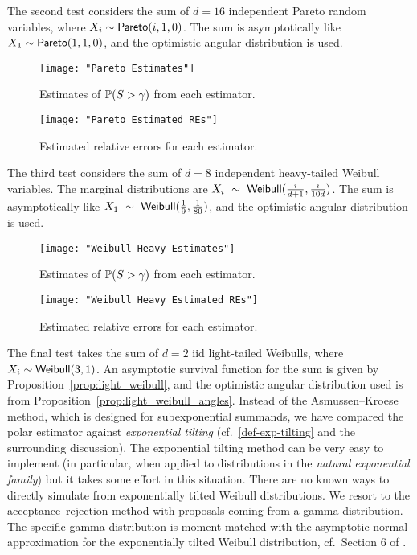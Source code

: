 The second test considers the sum of $d=16$ independent Pareto random variables, where $X_i \sim \mathsf{Pareto}(i, 1, 0)$. The sum is asymptotically like $X_1 \sim \mathsf{Pareto}(1, 1, 0)$, and the optimistic angular distribution is used.
\begin{figure}[H]
	\centering
	\texttt{[image: "Pareto Estimates"]}
	\caption{Estimates of $\operatorname{{\mathbb P}}(S > \gamma)$ from each estimator.}
\end{figure}

\begin{figure}[H]
	\centering
	\texttt{[image: "Pareto Estimated REs"]}
	\caption{Estimated relative errors for each estimator.}
\end{figure}


The third test considers the sum of $d=8$ independent heavy-tailed Weibull variables. The marginal distributions are $X_i~\sim~\mathsf{Weibull}(\frac{i}{d+1}, \frac{i}{10d})$. The sum is asymptotically like $X_1~\sim~\mathsf{Weibull}(\frac{1}{9}, \frac{1}{80})$, and the optimistic angular distribution is used.
\begin{figure}[H]
	\centering
	\texttt{[image: "Weibull Heavy Estimates"]}
	\caption{Estimates of $\operatorname{{\mathbb P}}(S > \gamma)$ from each estimator.}
\end{figure}

\begin{figure}[H]
	\centering
	\texttt{[image: "Weibull Heavy Estimated REs"]}
	\caption{Estimated relative errors for each estimator.}
\end{figure}

The final test takes the sum of $d=2$ iid light-tailed Weibulls, where $X_i \sim \mathsf{Weibull}(3, 1)$. An asymptotic survival function for the sum is given by Proposition~\ref{prop:light_weibull}, and the optimistic angular distribution used is from Proposition~\ref{prop:light_weibull_angles}. Instead of the Asmussen--Kroese method, which is designed for subexponential summands, we have compared the polar estimator against \emph{exponential tilting} (cf.\ \eqref{def-exp-tilting} and the surrounding discussion). The exponential tilting method can be very easy to implement (in particular, when applied to distributions in the \emph{natural exponential family}) but it takes some effort in this situation. There are no known ways to directly simulate from exponentially tilted Weibull distributions. We resort to the acceptance--rejection method with proposals coming from a gamma distribution. The specific gamma distribution is moment-matched with the asymptotic normal approximation for the exponentially tilted Weibull distribution, cf.\ Section 6 of \cite{asmussen2017tail}.

